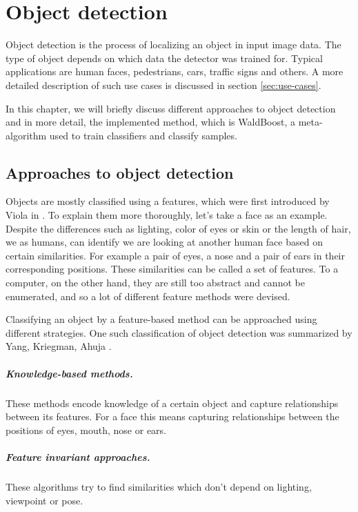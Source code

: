 \chapter{Object detection} \label{ch:object-detection}

Object detection is the process of localizing an object in input image data. The type of object depends on which data the detector was trained for. Typical applications are human faces, pedestrians, cars, traffic signs and others. A more detailed description of such use cases is discussed in section \ref{sec:use-cases}.

In this chapter, we will briefly discuss different approaches to object detection and in more detail, the implemented method, which is WaldBoost, a meta-algorithm used to train classifiers and classify samples.

\section{Approaches to object detection} \label{sec:approaches}

Objects are mostly classified using a features, which were first introduced by Viola in \cite{Viola93feature-basedrecognition}. To explain them more thoroughly, let's take a face as an example. Despite the differences such as lighting, color of eyes or skin or the length of hair, we as humans, can identify we are looking at another human face based on certain similarities. For example a pair of eyes, a nose and a pair of ears in their corresponding positions. These similarities can be called a set of features. To a computer, on the other hand, they are still too abstract and cannot be enumerated, and so a lot of different feature methods were devised.

Classifying an object by a feature-based method can be approached using different strategies. One such classification of object detection was summarized by Yang, Kriegman, Ahuja \cite{Yang02detectingfaces}.

\paragraph{Knowledge-based methods.} These methods encode knowledge of a certain object and capture relationships between its features. For a face this means capturing relationships between the positions of eyes, mouth, nose or ears.

\paragraph{Feature invariant approaches.} These algorithms try to find similarities which don't depend on lighting, viewpoint or pose. 


